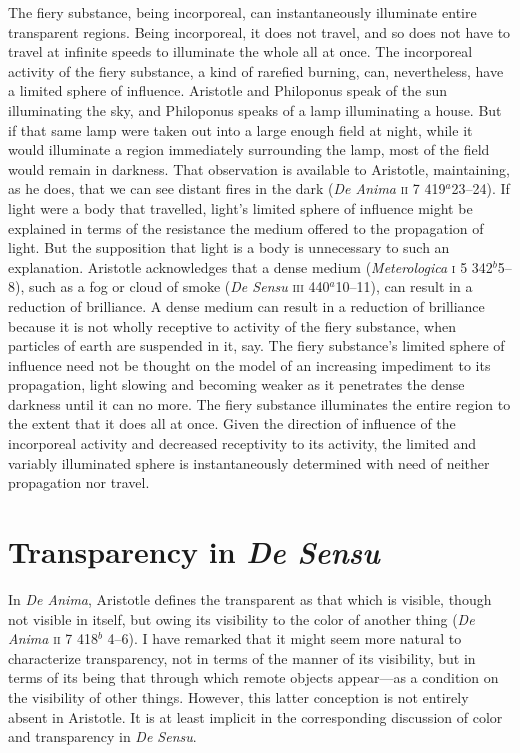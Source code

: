The fiery substance, being incorporeal, can instantaneously illuminate entire transparent regions. Being incorporeal, it does not travel, and so does not have to travel at infinite speeds to illuminate the whole all at once. The incorporeal activity of the fiery substance, a kind of rarefied burning, can, nevertheless, have a limited sphere of influence. Aristotle and Philoponus speak of the sun illuminating the sky, and Philoponus speaks of a lamp illuminating a house. But if that same lamp were taken out into a large enough field at night, while it would illuminate a region immediately surrounding the lamp, most of the field would remain in darkness. That observation is available to Aristotle, maintaining, as he does, that we can see distant fires in the dark (\emph{De Anima} \textsc{ii} 7 419\( ^{a} \)23--24). If light were a body that travelled, light's limited sphere of influence might be explained in terms of the resistance the medium offered to the propagation of light. But the supposition that light is a body is unnecessary to such an explanation. Aristotle acknowledges that a dense medium (\emph{Meterologica} \textsc{i} 5 342\( ^{b} \)5--8), such as a fog or cloud of smoke (\emph{De Sensu} \textsc{iii} 440\( ^{a} \)10--11), can result in a reduction of brilliance. A dense medium can result in a reduction of brilliance because it is not wholly receptive to activity of the fiery substance, when particles of earth are suspended in it, say. The fiery substance's limited sphere of influence need not be thought on the model of an increasing impediment to its propagation, light slowing and becoming weaker as it penetrates the dense darkness until it can no more. The fiery substance illuminates the entire region to the extent that it does all at once. Given the direction of influence of the incorporeal activity and decreased receptivity to its activity, the limited and variably illuminated sphere is instantaneously determined with need of neither propagation nor travel.


\section{Transparency in \emph{De Sensu}} %
\label{sec:transparency_in_de_sensu}

In \emph{De Anima}, Aristotle defines the transparent as that which is visible, though not visible in itself, but owing its visibility to the color of another thing (\emph{De Anima} \textsc{ii} 7 418\( ^{b} \) 4--6). I have remarked that it might seem more natural to characterize transparency, not in terms of the manner of its visibility, but in terms of its being that through which remote objects appear---as a condition on the visibility of other things. However, this latter conception is not entirely absent in Aristotle. It is at least implicit in the corresponding discussion of color and transparency in \emph{De Sensu}.

